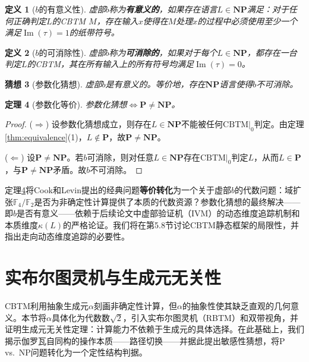 \documentclass{ctexart}
\newtheorem{theorem}{定理}[section]
\newtheorem{definition}[theorem]{定义}
\newtheorem{conjecture}[theorem]{猜想}
\newtheorem{proof}[theorem]{证明}
\begin{document}
	\begin{definition}[$b$的有意义性]\label{def:b-meaningful}
		虚部$b$称为\textbf{有意义的}，如果存在语言$L \in \mathbf{NP}$满足：对于任何正确判定$L$的CBTM $M$，存在输入$x$使得在$M$处理$x$的过程中必须使用至少一个满足$\operatorname{Im}(\tau) = 1$的纸带符号。
	\end{definition}
	
	\begin{definition}[$b$的可消除性]\label{def:b-eliminable}
		虚部$b$称为\textbf{可消除的}，如果对于每个$L \in \mathbf{NP}$，都存在一台判定$L$的CBTM，其在所有输入上的所有符号均满足$\operatorname{Im}(\tau)=0$。
	\end{definition}
	
	\begin{conjecture}[参数化猜想]\label{conj:parametrization}
		虚部$b$是有意义的。等价地，存在$\mathbf{NP}$语言使得$b$不可消除。
	\end{conjecture}
	
	\begin{theorem}[参数化等价]\label{thm:param-equivalence}
		参数化猜想$\iff \mathbf{P} \neq \mathbf{NP}$。
	\end{theorem}
	\begin{proof}
		($\Rightarrow$) 设参数化猜想成立，则存在$L \in \mathbf{NP}$不能被任何$\text{CBTM}|_0$判定。由定理\ref{thm:equivalence}(1)，$L \notin \mathbf{P}$，故$\mathbf{P} \neq \mathbf{NP}$。
		
		($\Leftarrow$) 设$\mathbf{P} \neq \mathbf{NP}$。若$b$可消除，则对任意$L \in \mathbf{NP}$存在$\text{CBTM}|_0$判定$L$，从而$L \in \mathbf{P}$，与$\mathbf{P} \neq \mathbf{NP}$矛盾。故$b$不可消除。
	\end{proof}
	
	定理\ref{thm:param-equivalence}将Cook和Levin提出的经典问题\textbf{等价转化}为一个关于虚部$b$的代数问题：域扩张$\mathbb{F}_4/\mathbb{F}_2$是否为非确定性计算提供了本质的代数资源？参数化猜想的最终解决——即$b$是否有意义——依赖于后续论文中虚部验证机（IVM）的动态维度追踪机制和本质维度$\kappa(L)$的严格论证。我们将在第5.8节讨论CBTM静态框架的局限性，并指出走向动态维度追踪的必要性。
	
	
	\section{实布尔图灵机与生成元无关性}
	
	CBTM利用抽象生成元$\alpha$刻画非确定性计算，但$\alpha$的抽象性使其缺乏直观的几何意义。本节将$\alpha$具体化为代数数$\sqrt{2}$，引入实布尔图灵机（RBTM）和双带视角，并证明生成元无关性定理：计算能力不依赖于生成元的具体选择。在此基础上，我们揭示伽罗瓦自同构的操作本质——路径切换——并据此提出敏感性猜想，将P vs.\ NP问题转化为一个定性结构判据。
	
\end{document}
